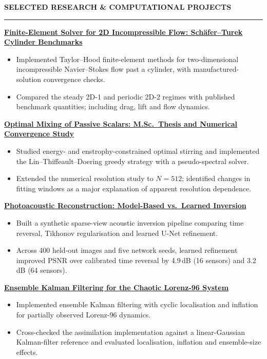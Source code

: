 \documentclass[10pt,a4paper]{article}
\newcommand{\cvsec}[1]{%
  \needspace{5\baselineskip}%
  \vspace{3pt}
  {\color{accent}\bfseries\uppercase{#1}}\\[-3pt]
  {\color{accent}\rule{\linewidth}{0.5pt}}%
  \vspace{4pt}%
}
\newenvironment{cvitems}{%
  \begin{itemize}[leftmargin=1.1em, itemsep=1pt, topsep=2pt, parsep=0pt, label=\textbullet, beginpenalty=10000]
}{%
  \end{itemize}%
}
\begin{document}
\cvsec{Selected Research \& Computational Projects}

\noindent\textbf{\href{https://github.com/AdebanjiAdelowo/fem-cylinder-flow}{Finite-Element Solver for 2D Incompressible Flow: Sch\"afer--Turek Cylinder Benchmarks}}
\begin{cvitems}
  \item Implemented Taylor--Hood finite-element methods for two-dimensional incompressible Navier--Stokes flow past a cylinder, with manufactured-solution convergence checks.
  \item Compared the steady 2D-1 and periodic 2D-2 regimes with published benchmark quantities; including drag, lift and flow dynamics.
\end{cvitems}

\noindent\textbf{\href{https://github.com/AdebanjiAdelowo/Master-Thesis}{Optimal Mixing of Passive Scalars: M.Sc.\ Thesis and Numerical Convergence Study}}
\begin{cvitems}
  \item Studied energy- and enstrophy-constrained optimal stirring and implemented the Lin--Thiffeault--Doering greedy strategy with a pseudo-spectral solver.
  \item Extended the numerical resolution study to $N=512$; identified changes in fitting windows as a major explanation of apparent resolution dependence. 
\end{cvitems}

\noindent\textbf{\href{https://github.com/AdebanjiAdelowo/photoacoustic-reconstruction}{Photoacoustic Reconstruction: Model-Based vs.\ Learned Inversion}}
\begin{cvitems}
  \item Built a synthetic sparse-view acoustic inversion pipeline comparing time reversal, Tikhonov regularisation and learned U-Net refinement.
  \item Across 400 held-out images and five network seeds, learned refinement improved PSNR over calibrated time reversal by 4.9\,dB (16 sensors) and 3.2\,dB (64 sensors).
\end{cvitems}

\noindent\textbf{\href{https://github.com/AdebanjiAdelowo/lorenz96-data-assimilation}{Ensemble Kalman Filtering for the Chaotic Lorenz-96 System}}
\begin{cvitems}
  \item Implemented ensemble Kalman filtering with cyclic localisation and inflation for partially observed Lorenz-96 dynamics.
  \item Cross-checked the assimilation implementation against a linear-Gaussian Kalman-filter reference and evaluated localisation, inflation and ensemble-size effects.
\end{cvitems}
\end{document}
